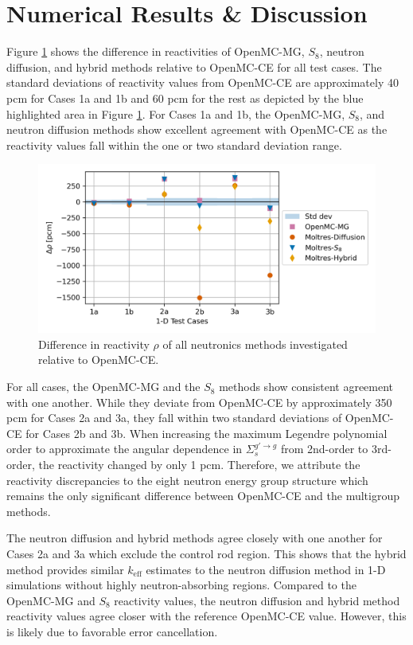 \documentclass[letterpaper]{mc2025}
\begin{document}
\section{Numerical Results \& Discussion}

Figure \ref{fig:1d-rho} shows the difference in reactivities of OpenMC-MG, $S_8$, neutron
diffusion, and hybrid methods relative to OpenMC-CE for all test cases. The standard deviations of
reactivity values from OpenMC-CE are approximately 40 pcm for Cases 1a and 1b and 60 pcm for the
rest as depicted by the blue highlighted area in Figure \ref{fig:1d-rho}. For Cases 1a and 1b, the
OpenMC-MG, $S_8$, and neutron diffusion methods show excellent agreement with OpenMC-CE as the
reactivity values fall within the one or two standard deviation range.
%
\begin{figure}[htb!]
  \centering
  \includegraphics[width=0.8\columnwidth]{rho}
  \caption{Difference in reactivity $\rho$ of all neutronics methods investigated relative
  to OpenMC-CE.}
  \label{fig:1d-rho}
\end{figure}

For all cases, the OpenMC-MG and the $S_8$ methods show consistent agreement with one another. 
While they deviate from OpenMC-CE by approximately 350 pcm for Cases 2a and 3a, they fall within
two standard deviations of OpenMC-CE for Cases 2b and 3b. When increasing the maximum Legendre
polynomial order to approximate the angular dependence in $\Sigma_s^{g'\rightarrow g}$ from
2nd-order to 3rd-order, the reactivity changed by only 1 pcm. Therefore, we attribute the reactivity
discrepancies to the eight neutron energy group structure which remains the
only significant difference between OpenMC-CE and the multigroup methods.

The neutron diffusion and hybrid methods agree closely with one another for Cases 2a and 3a which
exclude the control rod region. This shows that the hybrid method provides similar $k_\text{eff}$
estimates to the neutron diffusion method in 1-D simulations without highly neutron-absorbing
regions. Compared to the OpenMC-MG and $S_8$ reactivity values, the neutron diffusion and hybrid
method reactivity values agree closer with the reference OpenMC-CE value. However, this is likely
due to favorable error cancellation.
\end{document}
